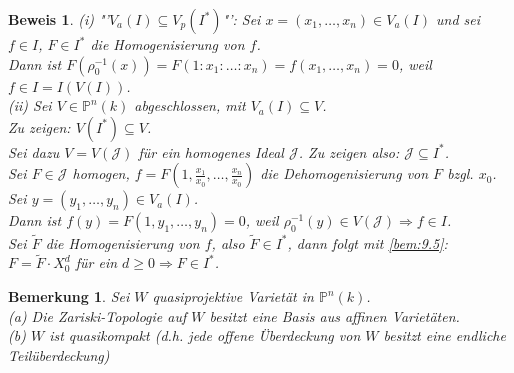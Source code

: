 \documentclass[a4paper,12pt]{report}
\theoremstyle{break}
\newtheorem{Bem}[Def]{Bemerkung}
\theoremstyle{nonumberbreak}
\theoremstyle{nonumberplain}
\newtheorem{Bew}{Beweis}
\begin{document}
\begin{Bew}
(i) "'$V_a(I)\subseteq V_p(I^*)$"': Sei $x=(x_1,\dots,x_n)\in V_a(I)$ und sei $f\in I$, $F\in I^*$ die Homogenisierung von $f$.\\
Dann ist $F(\rho_0^{-1}(x))=F(1:x_1:\dots:x_n)=f(x_1,\dots,x_n)=0$, weil $f\in I =I(V(I))$.\\
(ii) Sei $V\in \mathbb{P}^n(k)$ abgeschlossen, mit $V_a(I)\subseteq V$.\\
Zu zeigen: $V(I^*)\subseteq V$.\\
Sei dazu $V=V(\mathcal{J})$ für ein homogenes Ideal $\mathcal{J}$. Zu zeigen also: $\mathcal{J}\subseteq I^*$.\\
Sei $F\in \mathcal{J}$ homogen, $f=F(1,\frac{x_1}{x_0},\dots,\frac{x_n}{x_0})$ die Dehomogenisierung von $F$ bzgl. $x_0$.\\
Sei $y=(y_1,\dots,y_n)\in V_a(I)$.\\
Dann ist $f(y)=F(1,y_1,\dots,y_n)=0$, weil $\rho_0^{-1}(y)\in V(\mathcal{J})\Rightarrow f\in I$.\\
Sei $\tilde{F}$ die Homogenisierung von $f$, also $\tilde{F}\in I^*$, dann folgt mit \ref{bem:9.5}: $F=\tilde{F}\cdot X_0^d$ für ein $d\geq0\Rightarrow F\in I^*$.
\end{Bew}



\begin{Bem}
\label{bem:9.9}
Sei $W$ quasiprojektive Varietät in $\mathbb{P}^n(k)$.\\
(a) Die Zariski-Topologie auf $W$ besitzt eine Basis aus affinen Varietäten.\\
(b) $W$ ist quasikompakt (d.h. jede offene Überdeckung von $W$ besitzt eine endliche Teilüberdeckung)
\end{Bem}
\end{document}
